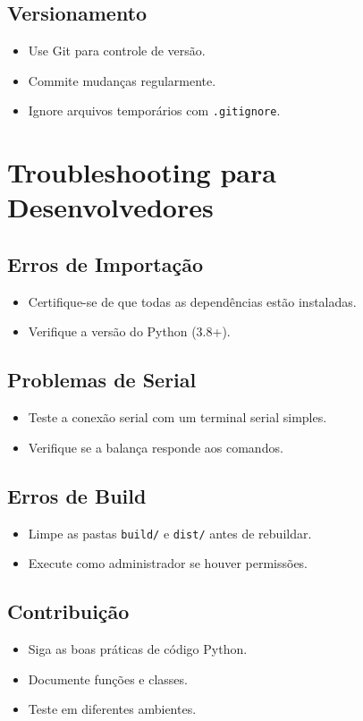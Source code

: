 \documentclass[12pt,a4paper]{article}
\begin{document}
\subsection{Versionamento}
\begin{itemize}
\item Use Git para controle de versão.
\item Commite mudanças regularmente.
\item Ignore arquivos temporários com \texttt{.gitignore}.
\end{itemize}

\section{Troubleshooting para Desenvolvedores}

\subsection{Erros de Importação}
\begin{itemize}
\item Certifique-se de que todas as dependências estão instaladas.
\item Verifique a versão do Python (3.8+).
\end{itemize}

\subsection{Problemas de Serial}
\begin{itemize}
\item Teste a conexão serial com um terminal serial simples.
\item Verifique se a balança responde aos comandos.
\end{itemize}

\subsection{Erros de Build}
\begin{itemize}
\item Limpe as pastas \texttt{build/} e \texttt{dist/} antes de rebuildar.
\item Execute como administrador se houver permissões.
\end{itemize}

\subsection{Contribuição}
\begin{itemize}
\item Siga as boas práticas de código Python.
\item Documente funções e classes.
\item Teste em diferentes ambientes.
\end{itemize}
\end{document}
